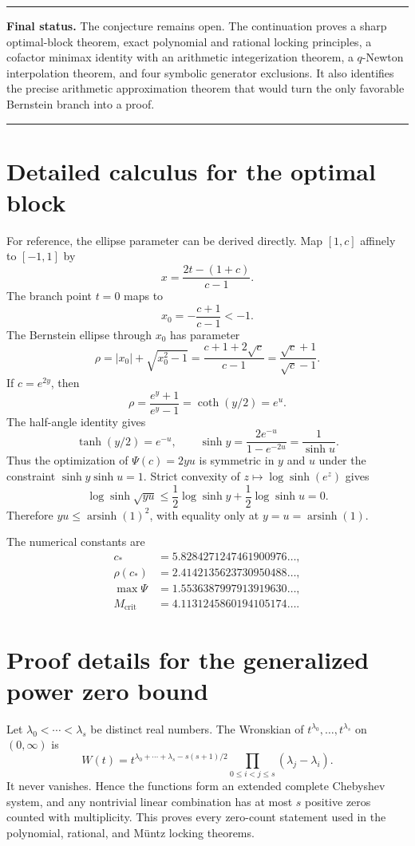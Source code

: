 \documentclass[11pt,oneside]{article}
\theoremstyle{definition}
\theoremstyle{remark}
\newcommand{\arsinh}{\operatorname{arsinh}}
\newenvironment{resultbox}
{\begin{center}\begin{minipage}{0.94\textwidth}\hrule\vspace{0.45em}}
{\vspace{0.35em}\hrule\end{minipage}\end{center}}
\begin{document}
\begin{resultbox}
\textbf{Final status.}
The conjecture remains open.  The continuation proves a sharp optimal-block theorem, exact
polynomial and rational locking principles, a cofactor minimax identity with an arithmetic
integerization theorem, a $q$-Newton interpolation theorem, and four symbolic generator
exclusions.  It also identifies the precise arithmetic approximation theorem that would turn
the only favorable Bernstein branch into a proof.
\end{resultbox}


\appendix

\section{Detailed calculus for the optimal block}
\label{app:optimal-block}

For reference, the ellipse parameter can be derived directly.  Map $[1,c]$ affinely to
$[-1,1]$ by
\[
 x=\frac{2t-(1+c)}{c-1}.
\]
The branch point $t=0$ maps to
\[
 x_0=-\frac{c+1}{c-1}<-1.
\]
The Bernstein ellipse through $x_0$ has parameter
\[
 \rho=|x_0|+\sqrt{x_0^2-1}
 =\frac{c+1+2\sqrt c}{c-1}
 =\frac{\sqrt c+1}{\sqrt c-1}.
\]
If $c=e^{2y}$, then
\[
 \rho=\frac{e^y+1}{e^y-1}=\coth(y/2)=e^u.
\]
The half-angle identity gives
\[
 \tanh(y/2)=e^{-u},
 \qquad
 \sinh y=\frac{2e^{-u}}{1-e^{-2u}}=\frac1{\sinh u}.
\]
Thus the optimization of $\Psi(c)=2yu$ is symmetric in $y$ and $u$ under the constraint
$\sinh y\sinh u=1$.  Strict convexity of $z\mapsto\log\sinh(e^z)$ gives
\[
 \log\sinh\sqrt{yu}
 \le\frac12\log\sinh y+\frac12\log\sinh u=0.
\]
Therefore $yu\le\arsinh(1)^2$, with equality only at $y=u=\arsinh(1)$.

The numerical constants are
\begin{align*}
 c_*&=5.8284271247461900976\ldots,\\
 \rho(c_*)&=2.4142135623730950488\ldots,\\
 \max\Psi&=1.5536387997913919630\ldots,\\
 M_{\mathrm{crit}}&=4.1131245860194105174\ldots.
\end{align*}


\section{Proof details for the generalized power zero bound}
\label{app:cheb-zero}

Let $\lambda_0<\cdots<\lambda_s$ be distinct real numbers.  The Wronskian of
$t^{\lambda_0},\ldots,t^{\lambda_s}$ on $(0,\infty)$ is
\[
 W(t)=t^{\lambda_0+\cdots+\lambda_s-s(s+1)/2}
      \prod_{0\le i<j\le s}(\lambda_j-\lambda_i).
\]
It never vanishes.  Hence the functions form an extended complete Chebyshev system, and any
nontrivial linear combination has at most $s$ positive zeros counted with multiplicity.
This proves every zero-count statement used in the polynomial, rational, and M\"untz locking
theorems.
\end{document}
